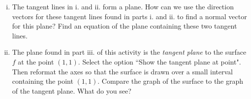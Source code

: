 \begin{pa}
\begin{enumerate}[i.]
\begin{comment}
\end{comment}

        \item The tangent lines in i. and ii. form a plane. How can we use the direction vectors for these tangent lines found in parts i. and ii. to find a normal vector for this plane? Find an equation of the plane containing these two tangent lines.



\begin{comment}

The two vectors $\langle 1,0,f_x(1,1) \rangle = \langle 1,0,2 \rangle$ and $\langle 0,1,f_y(1,1) \rangle = \langle 0,1,-2 \rangle$ are parallel to the plane, so a normal vector to the plane is
\[\langle 1,0,f_x(1,1) \rangle \times \langle 0,1,f_y(1,1) \rangle = \langle 1,0,2 \rangle \times \langle 0,1,-2 \rangle = \langle -2,2,1 \rangle.\]
Since the point $(1,1,f(1,1)) = (1,1,0)$ is in the plane, an equation of this plane is
\[-2(x-1)+2(y-1)+z = 0.\]



\end{comment}


        \item The plane found in part iii. of this activity is the \emph{tangent plane} to the surface $f$ at the point $(1,1)$. Select the option ``Show the tangent plane at point". Then reformat the axes so that the surface is drawn over a small interval containing the point $(1,1)$. Compare the graph of the surface to the graph of the tangent plane. What do you see?



\begin{comment}

As we plot the surface over a smaller and smaller domain containing the point $(1,1)$, the graph of the surface and the graph of the tangent plane are indistinguishable from each other. So $f$ is well approximated by its tangent plane for points $(x,y)$ close to $(1,1)$.



\end{comment}
        \end{enumerate}
    \ea



\end{pa} \afterpa 